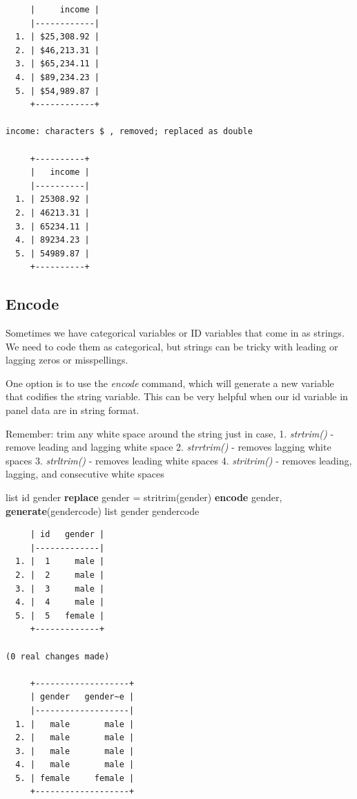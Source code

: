 \documentclass[
]{book}
\newenvironment{Shaded}{\begin{snugshade}}{\end{snugshade}}
\newcommand{\KeywordTok}[1]{\textcolor[rgb]{0.13,0.29,0.53}{\textbf{#1}}}
\newcommand{\NormalTok}[1]{#1}
\newcommand{\OtherTok}[1]{\textcolor[rgb]{0.56,0.35,0.01}{#1}}
\begin{document}
\begin{verbatim}
     |     income |
     |------------|
  1. | $25,308.92 |
  2. | $46,213.31 |
  3. | $65,234.11 |
  4. | $89,234.23 |
  5. | $54,989.87 |
     +------------+

income: characters $ , removed; replaced as double

     +----------+
     |   income |
     |----------|
  1. | 25308.92 |
  2. | 46213.31 |
  3. | 65234.11 |
  4. | 89234.23 |
  5. | 54989.87 |
     +----------+
\end{verbatim}

\subsection{Encode}\label{encode}

Sometimes we have categorical variables or ID variables that come in as strings. We need to code them as categorical, but strings can be tricky with leading or lagging zeros or misspellings.

One option is to use the \emph{encode} command, which will generate a new variable that codifies the string variable. This can be very helpful when our id variable in panel data are in string format.

Remember: trim any white space around the string just in case,
1. \emph{strtrim()} - remove leading and lagging white space
2. \emph{strrtrim()} - removes lagging white spaces
3. \emph{strltrim()} - removes leading white spaces
4. \emph{stritrim()} - removes leading, lagging, and consecutive white spaces

\begin{Shaded}
\begin{Highlighting}[]
\OtherTok{list}\NormalTok{ id gender}
\KeywordTok{replace}\NormalTok{ gender = stritrim(gender)}
\KeywordTok{encode}\NormalTok{ gender, }\KeywordTok{generate}\NormalTok{(gendercode)}
\OtherTok{list}\NormalTok{ gender gendercode}
\end{Highlighting}
\end{Shaded}

\begin{verbatim}
     | id   gender |
     |-------------|
  1. |  1     male |
  2. |  2     male |
  3. |  3     male |
  4. |  4     male |
  5. |  5   female |
     +-------------+

(0 real changes made)

     +-------------------+
     | gender   gender~e |
     |-------------------|
  1. |   male       male |
  2. |   male       male |
  3. |   male       male |
  4. |   male       male |
  5. | female     female |
     +-------------------+
\end{verbatim}
\end{document}
